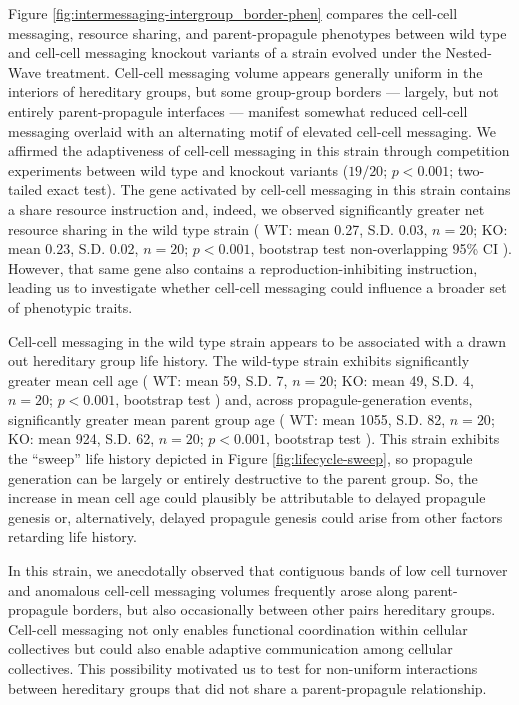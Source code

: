 Figure \ref{fig:intermessaging-intergroup_border-phen} compares the cell-cell messaging, resource sharing, and parent-propagule phenotypes between wild type and cell-cell messaging knockout variants of a strain evolved under the Nested-Wave treatment.
Cell-cell messaging volume appears generally uniform in the interiors of hereditary groups, but some group-group borders --- largely, but not entirely parent-propagule interfaces --- manifest somewhat reduced cell-cell messaging overlaid with an alternating motif of elevated cell-cell messaging.
We affirmed the adaptiveness of cell-cell messaging in this strain through competition experiments between wild type and knockout variants ($19/20$; $p < 0.001$; two-tailed exact test).
The gene activated by cell-cell messaging in this strain contains a share resource instruction and, indeed, we observed significantly greater net resource sharing in the wild type strain
(%
WT: mean 0.27, S.D. 0.03, $n=20$;
KO: mean 0.23, S.D. 0.02, $n=20$;
$p < 0.001$, bootstrap test
non-overlapping 95\% CI%
). %
However, that same gene also contains a reproduction-inhibiting instruction, leading us to investigate whether cell-cell messaging could influence a broader set of phenotypic traits.

Cell-cell messaging in the wild type strain appears to be associated with a drawn out hereditary group life history.
The wild-type strain exhibits significantly greater mean cell age
(%
WT: mean 59, S.D. 7, $n=20$;
KO: mean 49, S.D. 4, $n=20$;
$p < 0.001$, bootstrap test%
) %
and, across propagule-generation events, significantly greater mean parent group age
(%
WT: mean 1055, S.D. 82, $n=20$;
KO: mean 924, S.D. 62, $n=20$;
$p < 0.001$, bootstrap test%
). %
This strain exhibits the ``sweep'' life history depicted in Figure \ref{fig:lifecycle-sweep}, so propagule generation can be largely or entirely destructive to the parent group.
So, the increase in mean cell age could plausibly be attributable to delayed propagule genesis or, alternatively, delayed propagule genesis could arise from other factors retarding life history.

In this strain, we anecdotally observed that contiguous bands of low cell turnover and anomalous cell-cell messaging volumes frequently arose along parent-propagule borders, but also occasionally between other pairs hereditary groups.
Cell-cell messaging not only enables functional coordination within cellular collectives but could also enable adaptive communication among cellular collectives.
This possibility motivated us to test for non-uniform interactions between hereditary groups that did not share a parent-propagule relationship.

